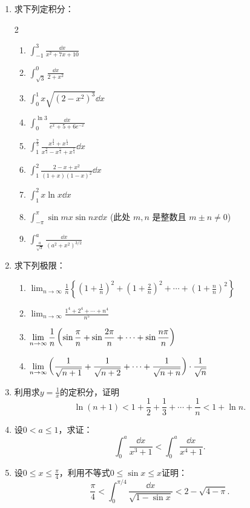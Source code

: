\begin{enumerate}
\item 求下列定积分：
\begin{multicols}{2}
    \begin{enumerate}
        \item  $\displaystyle\int_{-1}^{3} \frac{\dd x}{x^{2}+7 x+10} $
        \item  $\displaystyle\int_{\sqrt{3}}^{0} \frac{\dd x}{2+x^{2}}$
        \item  $\displaystyle\int_{0}^{1} x \sqrt{\left(2-x^{2}\right)^{3}} \dd x$
        \item  $\displaystyle\int_{0}^{\ln 3} \frac{\dd x}{e^{x}+5+6 e^{-x}}$
        \item  $\displaystyle\int_{1}^{\tfrac{7}{5}} \frac{x^{\tfrac{3}{4}}+x^{\tfrac{1}{4}}}{x^{\tfrac{9}{4}}-x^{\tfrac{5}{4}}+x^{\tfrac{1}{4}}} \dd x$
        \item  $\displaystyle\int_{1}^{2} \frac{2-x+x^{2}}{(1+x)(1-x)^{2}} \dd x$
        \item  $\displaystyle\int_{1}^{2} x \ln x \dd x$
        \item  $\displaystyle\int_{-\pi}^{\pi} \sin m x \sin n x \dd x$
        (此处 $m, n$ 是整数且 $m \pm n\ne 0$)
\item  $\displaystyle\int_{\tfrac{a}{\sqrt{3}}}^{a} \frac{\dd x}{\left(a^{2}+x^{2}\right)^{3 / 2}}$
\end{enumerate}
\end{multicols}
\item  求下列极限：
    \begin{enumerate}
\item  $\displaystyle\lim _{n \to  \infty} \frac{1}{n}\left\{\left(1+
\frac{1}{n}\right)^2+\left(1+\frac{2}{n}\right)^2+\cdots+
\left(1+\frac{n}{n}\right)^{2}\right\}$
\item $\displaystyle\lim _{n \to  \infty} \frac{1^{4}+2^{4}+\cdots+n^{4}}{n^{5}}$
\item $\displaystyle\lim_{n\to\infty}\dfrac{1}{n}\left(\sin\dfrac{\pi}{n}+\sin\dfrac{2\pi}{n}+\cdots+\sin\dfrac{n\pi}{n}\right)$
\item $\displaystyle\lim_{n\to\infty}\left(\dfrac{1}{\sqrt{n+1}}+\dfrac{1}{\sqrt{n+2}}+\cdots+\dfrac{1}{\sqrt{n+n}}\right)\cdot \dfrac{1}{\sqrt{n}}$
\end{enumerate}

\item 利用求$y=\frac{1}{x}$的定积分，证明
\[\ln(n+1)<1+\frac{1}{2}+\frac{1}{3}+\cdots+\frac{1}{n}<1+\ln n.\]
\item 设$0<a\le 1$，求证：
\[\int^a_0\frac{\dd x}{x^3+1}<\int^a_0\frac{\dd x}{x^4+1}. \]
\item 设$0\le x\le \frac{\pi}{4}$，利用不等式$0\le \sin x\le x$证明：
\[\frac{\pi}{4}<\int^{\pi/4}_0\frac{\dd x}{\sqrt{1-\sin x}}<2-\sqrt{4-\pi}.\]


\end{enumerate}
